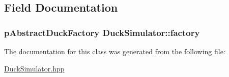 \subsection{Field Documentation}
\hypertarget{classDuckSimulator_ad151b1df82adb3a176a790df0b6ae2b1}{
\subsubsection[{factory}]{\setlength{\rightskip}{0pt plus 5cm}p\-Abstract\-Duck\-Factory Duck\-Simulator\-::factory}}\label{classDuckSimulator_ad151b1df82adb3a176a790df0b6ae2b1}


The documentation for this class was generated from the following file\-:\begin{DoxyCompactItemize}
\item 
\hyperlink{DuckSimulator_8hpp}{Duck\-Simulator.\-hpp}\end{DoxyCompactItemize}
